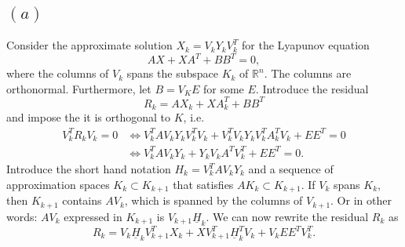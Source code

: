 
\subsection*{$(a)$}
Consider the approximate solution $X_{k} = V_{k}Y_{k}V_{k}^{T}$ for the Lyapunov equation
\begin{equation}
  AX+XA^{T} + BB^{T} = 0,
\end{equation}
where the columns of $V_{k}$ spans the subspace $K_{k}$ of $\mathbb{R}^{n}$. The columns are orthonormal. Furthermore, let $B = V_{K}E$ for some $E$. Introduce the residual
\begin{equation}
  R_{k} = AX_{k}+XA_{k}^{T} + BB^{T}
\end{equation}
and impose the it is orthogonal to $K$, i.e.
\begin{align}
  V_{k}^{T}R_{k}V_{k} = 0 &\Leftrightarrow V_{k}^{T}AV_{k}Y_{k}V_{k}^{T}V_{k}+V_{k}^{T}V_{k}Y_{k}V_{k}^{T}A_{k}^{T}V_{k} + EE^{T} = 0\\
  \label{eq:LyapY}
   &\Leftrightarrow V_{k}^{T}AV_{k}Y_{k}+Y_{k}V_{k}A^{T}V_{k}^{T} + EE^{T} = 0.
\end{align}
Introduce the short hand notation $H_{k} = V_{k}^{T}AV_{k}Y_{k}$ and a sequence of approximation spaces $K_{k}\subset K_{k+1}$ that satisfies $AK_{k}\subset K_{k+1}$. If $V_{k}$ spans $K_{k}$, then $K_{k+1}$ contains $AV_{k}$, which is spanned by the columns of $V_{k+1}$. Or in other words: $AV_{k}$ expressed in $K_{k+1}$ is $V_{k+1}\underline{H}_{k}$.
We can now rewrite the residual $R_{k}$ as
\begin{equation}
  R_{k} = V_{k}\underline{H}_{k}V_{k+1}^{T} X_{k}+XV_{k+1}^{T}\underline{H}_{k}^{T}V_{k} + V_{k}EE^{T}V_{k}^{T}.
\end{equation}


